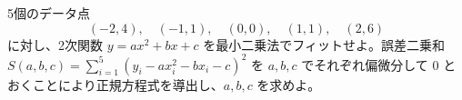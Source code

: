
5個のデータ点
\[
(-2,4),\quad (-1,1),\quad (0,0),\quad (1,1),\quad (2,6)
\]
に対し、2次関数 $y = ax^2 + bx + c$ を最小二乗法でフィットせよ。誤差二乗和 $S(a,b,c) = \displaystyle\sum_{i=1}^{5}(y_i - ax_i^2 - bx_i - c)^2$ を $a, b, c$ でそれぞれ偏微分して $0$ とおくことにより正規方程式を導出し、$a, b, c$ を求めよ。
